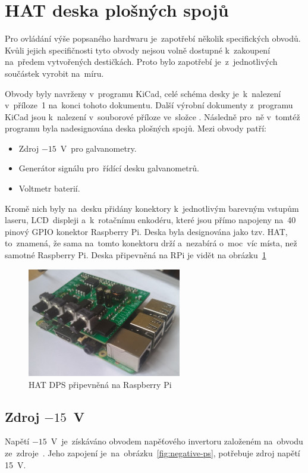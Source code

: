 \section{HAT deska plošných spojů}
Pro ovládání výše popsaného hardwaru je~zapotřebí několik specifických obvodů.
Kvůli jejich specifičnosti tyto obvody nejsou volně dostupné k~zakoupení na~předem vytvořených destičkách. Proto bylo zapotřebí je~z~jednotlivých součástek vyrobit na~míru.

Obvody byly navrženy v~programu KiCad, celé schéma desky je~k~nalezení v~příloze~1 na~konci tohoto dokumentu. Další výrobní dokumenty z~programu KiCad jsou k~nalezení v~souborové příloze ve~složce . Následně pro~ně v~tomtéž programu byla nadesignována deska plošných spojů. Mezi obvody patří:
\begin{itemize}
  \item Zdroj $-15$~V~pro galvanometry.
  \item Generátor signálu pro~řídící desku galvanometrů.
  \item Voltmetr baterií.
\end{itemize}

Kromě nich byly na~desku přidány konektory k~jednotlivým barevným vstupům laseru, LCD~displeji a~k~rotačnímu enkodéru, které jsou přímo napojeny na~40 pinový GPIO konektor Raspberry Pi.
Deska byla designována jako tzv. HAT, to~znamená, že sama na~tomto konektoru drží a~nezabírá o~moc~víc místa, než samotné Raspberry Pi. Deska připevněná na RPi je vidět na obrázku~\ref{fig:pcb-mounted}

\begin{figure}[htb]
  \centering
  \includegraphics[width=0.6\textwidth]{img/pcb-mounted.jpg}
  \caption{\label{fig:pcb-mounted} HAT DPS připevněná na Raspberry Pi }
\end{figure}

\subsection{Zdroj $-15$~V}\label{sec:negative-ps}
Napětí $-15$~V~je~získáváno obvodem napěťového invertoru založeném na~obvodu ze~zdroje~\cite{ampalyzer}. Jeho zapojení je~na~obrázku~\ref{fig:negative-ps}, potřebuje zdroj napětí 15~V.

